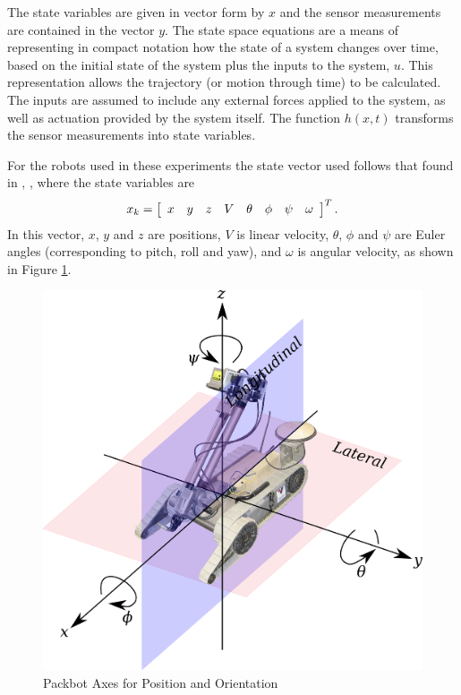 The state variables are given in vector form by $x$ and the sensor measurements are contained in the vector $y$. The state space equations are a means of representing in compact notation how the state of a system changes over time, based on the initial state of the system plus the inputs to the system, $u$. This representation allows the trajectory (or motion through time) to be calculated. The inputs are assumed to include any external forces applied to the system, as well as actuation provided by the system itself. The function $h(x,t)$ transforms the sensor measurements into state variables.

For the robots used in these experiments the state vector used follows that found in \cite{Kelly_1994_338}, \cite{Kelly_1994_333}, where the state variables are
\begin{align*}
x_k = \left[\begin{array}{c c c c c c c c} x & y & z & V & \theta & \phi & \psi & \omega \end{array}\right]^T.
\end{align*}
In this vector, $x$, $y$ and $z$ are positions, $V$ is linear velocity, $\theta$, $\phi$ and $\psi$ are Euler angles (corresponding to pitch, roll and yaw), and $\omega$ is angular velocity, as shown in Figure \ref{fig:packbotaxes}.

\begin{figure}[ht!]
    \centering
    \includegraphics[width=.8\textwidth]{images/packbotaxes}
    \caption{Packbot Axes for Position and Orientation}
    \label{fig:packbotaxes}
\end{figure}

